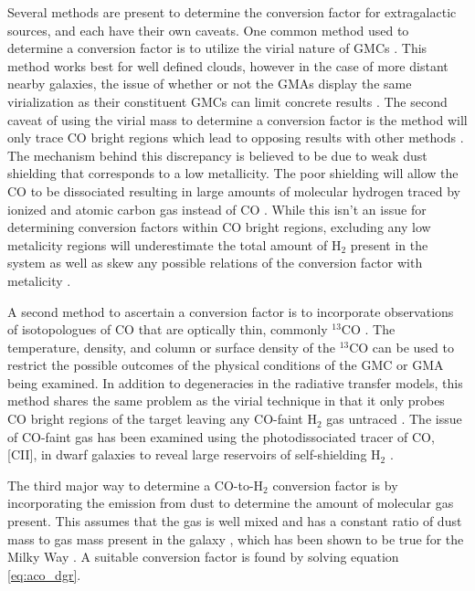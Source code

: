 Several methods are present to determine the conversion factor for extragalactic sources, and each have their own caveats.  One common method used to determine a conversion factor is to utilize the virial nature of GMCs \citep{bolatto2013}.  This method works best for well defined clouds, however in the case of more distant nearby galaxies, the issue of whether or not the GMAs display the same virialization as their constituent GMCs can limit concrete results \citep{bolatto2013}.  The second caveat of using the virial mass to determine a conversion factor is the method will only trace CO bright regions which lead to opposing results with other methods \citep{bolatto2013}.  The mechanism behind this discrepancy is believed to be due to weak dust shielding that corresponds to a low metallicity.  The poor shielding will allow the CO to be dissociated resulting in large amounts of molecular hydrogen traced by ionized and atomic carbon gas instead of CO \citep{bolatto2013}.  While this isn't an issue for determining conversion factors within CO bright regions, excluding any low metalicity regions will underestimate the total amount of H$_2$ present in the system as well as skew any possible relations of the conversion factor with metalicity \citep{bolatto2013}.

A second method to ascertain a conversion factor is to incorporate observations of isotopologues of CO that are optically thin, commonly $^{13}$CO \citep{bolatto2013}.   The temperature, density, and column or surface density of the $^{13}$CO can be used to restrict the possible outcomes of the physical conditions of the GMC or GMA being examined.  In addition to degeneracies in the radiative transfer models, this method shares the same problem as the virial technique in that it only probes CO bright regions of the target leaving any CO-faint H$_2$ gas untraced \citep{bolatto2013}.  The issue of CO-faint gas has been examined using the photodissociated tracer of CO, [CII], in dwarf galaxies to reveal large reservoirs of self-shielding H$_2$ \citep{madden1997}.

The third major way to determine a CO-to-H$_2$ conversion factor is by incorporating the emission from dust to determine the amount of molecular gas present.  This assumes that the gas is well mixed and has a constant ratio of dust mass to gas mass present in the galaxy \citep{leroy2011}, which has been shown to be true for the Milky Way \citep{boulanger1996}.  A suitable conversion factor is found by solving equation \ref{eq:aco_dgr}.

